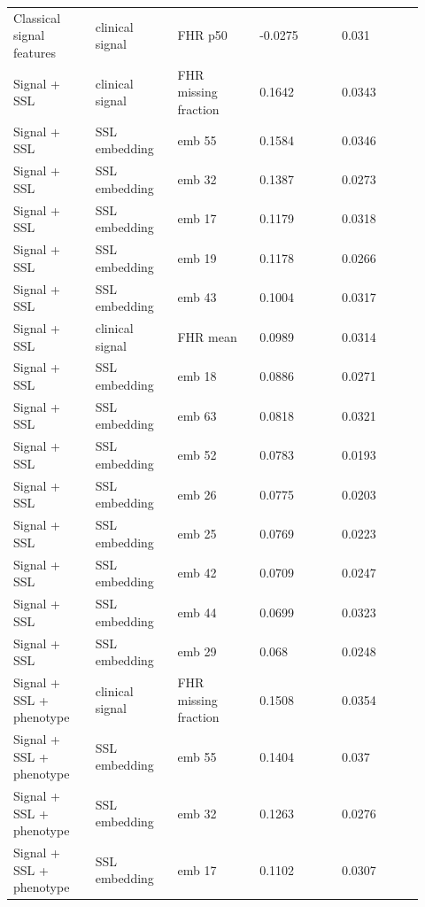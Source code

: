 \documentclass[11pt]{article}
\begin{document}
\begin{landscape}
\begin{longtable}{L{0.184\linewidth} L{0.184\linewidth} L{0.184\linewidth} L{0.184\linewidth} L{0.184\linewidth}}
Classical signal features & clinical signal & FHR p50 & -\allowbreak{}0.\allowbreak{}0275 & 0.\allowbreak{}031 \\
Signal + SSL & clinical signal & FHR missing fraction & 0.\allowbreak{}1642 & 0.\allowbreak{}0343 \\
Signal + SSL & SSL embedding & emb 55 & 0.\allowbreak{}1584 & 0.\allowbreak{}0346 \\
Signal + SSL & SSL embedding & emb 32 & 0.\allowbreak{}1387 & 0.\allowbreak{}0273 \\
Signal + SSL & SSL embedding & emb 17 & 0.\allowbreak{}1179 & 0.\allowbreak{}0318 \\
Signal + SSL & SSL embedding & emb 19 & 0.\allowbreak{}1178 & 0.\allowbreak{}0266 \\
Signal + SSL & SSL embedding & emb 43 & 0.\allowbreak{}1004 & 0.\allowbreak{}0317 \\
Signal + SSL & clinical signal & FHR mean & 0.\allowbreak{}0989 & 0.\allowbreak{}0314 \\
Signal + SSL & SSL embedding & emb 18 & 0.\allowbreak{}0886 & 0.\allowbreak{}0271 \\
Signal + SSL & SSL embedding & emb 63 & 0.\allowbreak{}0818 & 0.\allowbreak{}0321 \\
Signal + SSL & SSL embedding & emb 52 & 0.\allowbreak{}0783 & 0.\allowbreak{}0193 \\
Signal + SSL & SSL embedding & emb 26 & 0.\allowbreak{}0775 & 0.\allowbreak{}0203 \\
Signal + SSL & SSL embedding & emb 25 & 0.\allowbreak{}0769 & 0.\allowbreak{}0223 \\
Signal + SSL & SSL embedding & emb 42 & 0.\allowbreak{}0709 & 0.\allowbreak{}0247 \\
Signal + SSL & SSL embedding & emb 44 & 0.\allowbreak{}0699 & 0.\allowbreak{}0323 \\
Signal + SSL & SSL embedding & emb 29 & 0.\allowbreak{}068 & 0.\allowbreak{}0248 \\
Signal + SSL + phenotype & clinical signal & FHR missing fraction & 0.\allowbreak{}1508 & 0.\allowbreak{}0354 \\
Signal + SSL + phenotype & SSL embedding & emb 55 & 0.\allowbreak{}1404 & 0.\allowbreak{}037 \\
Signal + SSL + phenotype & SSL embedding & emb 32 & 0.\allowbreak{}1263 & 0.\allowbreak{}0276 \\
Signal + SSL + phenotype & SSL embedding & emb 17 & 0.\allowbreak{}1102 & 0.\allowbreak{}0307 \\

\end{longtable}
\end{landscape}
\end{document}
